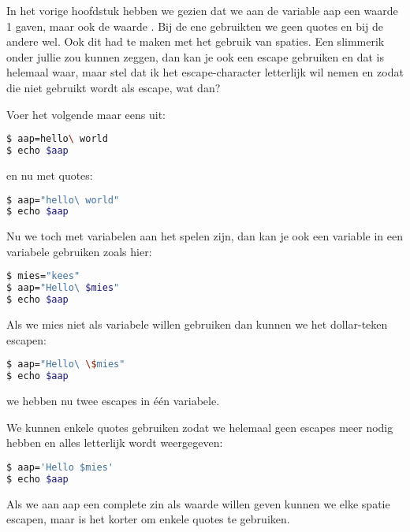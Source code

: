 In het vorige hoofdstuk hebben we gezien dat we aan de variable aap een waarde 1 gaven, maar ook de waarde . Bij de ene gebruikten we geen quotes en bij de andere wel. Ook dit had te maken met het gebruik van spaties. Een slimmerik onder jullie zou kunnen zeggen, dan kan je ook een escape gebruiken en dat is helemaal waar, maar stel dat ik het escape-character letterlijk wil nemen en zodat die niet gebruikt wordt als escape, wat dan?

Voer het volgende maar eens uit:
\begin{lstlisting}[language=bash]
$ aap=hello\ world
$ echo $aap
\end{lstlisting}

en nu met quotes:
\begin{lstlisting}[language=bash]
$ aap="hello\ world"
$ echo $aap
\end{lstlisting}

Nu we toch met variabelen aan het spelen zijn, dan kan je ook een variable in een variabele gebruiken zoals hier:
\begin{lstlisting}[language=bash]
$ mies="kees"
$ aap="Hello\ $mies"
$ echo $aap
\end{lstlisting}

Als we mies niet als variabele willen gebruiken dan kunnen we het dollar-teken escapen:
\begin{lstlisting}[language=bash]
$ aap="Hello\ \$mies"
$ echo $aap
\end{lstlisting}
we hebben nu twee escapes in \'e\'en variabele.

We kunnen enkele quotes gebruiken zodat we helemaal geen escapes meer nodig hebben en alles letterlijk wordt weergegeven:
\begin{lstlisting}[language=bash]
$ aap='Hello $mies'
$ echo $aap
\end{lstlisting}
Als we aan aap een complete zin als waarde willen geven kunnen we elke spatie escapen, maar is het korter om enkele quotes te gebruiken.

